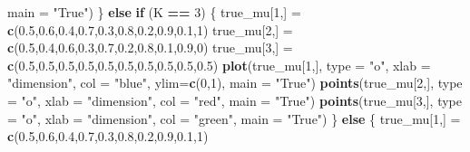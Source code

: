 \documentclass[]{article}
\newenvironment{Shaded}{\begin{snugshade}}{\end{snugshade}}
\newcommand{\KeywordTok}[1]{\textcolor[rgb]{0.13,0.29,0.53}{\textbf{#1}}}
\newcommand{\DataTypeTok}[1]{\textcolor[rgb]{0.13,0.29,0.53}{#1}}
\newcommand{\DecValTok}[1]{\textcolor[rgb]{0.00,0.00,0.81}{#1}}
\newcommand{\FloatTok}[1]{\textcolor[rgb]{0.00,0.00,0.81}{#1}}
\newcommand{\StringTok}[1]{\textcolor[rgb]{0.31,0.60,0.02}{#1}}
\newcommand{\ControlFlowTok}[1]{\textcolor[rgb]{0.13,0.29,0.53}{\textbf{#1}}}
\newcommand{\OperatorTok}[1]{\textcolor[rgb]{0.81,0.36,0.00}{\textbf{#1}}}
\newcommand{\NormalTok}[1]{#1}
\begin{document}
\begin{Shaded}
\begin{Highlighting}[]
\DataTypeTok{main =} \StringTok{"True"}\NormalTok{)}
\NormalTok{\} }\ControlFlowTok{else} \ControlFlowTok{if}\NormalTok{ (K }\OperatorTok{==}\StringTok{ }\DecValTok{3}\NormalTok{) \{}
\NormalTok{true_mu[}\DecValTok{1}\NormalTok{,] =}\StringTok{ }\KeywordTok{c}\NormalTok{(}\FloatTok{0.5}\NormalTok{,}\FloatTok{0.6}\NormalTok{,}\FloatTok{0.4}\NormalTok{,}\FloatTok{0.7}\NormalTok{,}\FloatTok{0.3}\NormalTok{,}\FloatTok{0.8}\NormalTok{,}\FloatTok{0.2}\NormalTok{,}\FloatTok{0.9}\NormalTok{,}\FloatTok{0.1}\NormalTok{,}\DecValTok{1}\NormalTok{)}
\NormalTok{true_mu[}\DecValTok{2}\NormalTok{,] =}\StringTok{ }\KeywordTok{c}\NormalTok{(}\FloatTok{0.5}\NormalTok{,}\FloatTok{0.4}\NormalTok{,}\FloatTok{0.6}\NormalTok{,}\FloatTok{0.3}\NormalTok{,}\FloatTok{0.7}\NormalTok{,}\FloatTok{0.2}\NormalTok{,}\FloatTok{0.8}\NormalTok{,}\FloatTok{0.1}\NormalTok{,}\FloatTok{0.9}\NormalTok{,}\DecValTok{0}\NormalTok{)}
\NormalTok{true_mu[}\DecValTok{3}\NormalTok{,] =}\StringTok{ }\KeywordTok{c}\NormalTok{(}\FloatTok{0.5}\NormalTok{,}\FloatTok{0.5}\NormalTok{,}\FloatTok{0.5}\NormalTok{,}\FloatTok{0.5}\NormalTok{,}\FloatTok{0.5}\NormalTok{,}\FloatTok{0.5}\NormalTok{,}\FloatTok{0.5}\NormalTok{,}\FloatTok{0.5}\NormalTok{,}\FloatTok{0.5}\NormalTok{,}\FloatTok{0.5}\NormalTok{)}
\KeywordTok{plot}\NormalTok{(true_mu[}\DecValTok{1}\NormalTok{,], }\DataTypeTok{type =} \StringTok{"o"}\NormalTok{, }\DataTypeTok{xlab =} \StringTok{"dimension"}\NormalTok{, }\DataTypeTok{col =} \StringTok{"blue"}\NormalTok{, }\DataTypeTok{ylim=}\KeywordTok{c}\NormalTok{(}\DecValTok{0}\NormalTok{,}\DecValTok{1}\NormalTok{),}
\DataTypeTok{main =} \StringTok{"True"}\NormalTok{)}
\KeywordTok{points}\NormalTok{(true_mu[}\DecValTok{2}\NormalTok{,], }\DataTypeTok{type =} \StringTok{"o"}\NormalTok{, }\DataTypeTok{xlab =} \StringTok{"dimension"}\NormalTok{, }\DataTypeTok{col =} \StringTok{"red"}\NormalTok{,}
\DataTypeTok{main =} \StringTok{"True"}\NormalTok{)}
\KeywordTok{points}\NormalTok{(true_mu[}\DecValTok{3}\NormalTok{,], }\DataTypeTok{type =} \StringTok{"o"}\NormalTok{, }\DataTypeTok{xlab =} \StringTok{"dimension"}\NormalTok{, }\DataTypeTok{col =} \StringTok{"green"}\NormalTok{,}
\DataTypeTok{main =} \StringTok{"True"}\NormalTok{)}
\NormalTok{\} }\ControlFlowTok{else}\NormalTok{ \{}
\NormalTok{true_mu[}\DecValTok{1}\NormalTok{,] =}\StringTok{ }\KeywordTok{c}\NormalTok{(}\FloatTok{0.5}\NormalTok{,}\FloatTok{0.6}\NormalTok{,}\FloatTok{0.4}\NormalTok{,}\FloatTok{0.7}\NormalTok{,}\FloatTok{0.3}\NormalTok{,}\FloatTok{0.8}\NormalTok{,}\FloatTok{0.2}\NormalTok{,}\FloatTok{0.9}\NormalTok{,}\FloatTok{0.1}\NormalTok{,}\DecValTok{1}\NormalTok{)}

\end{Highlighting}
\end{Shaded}
\end{document}
